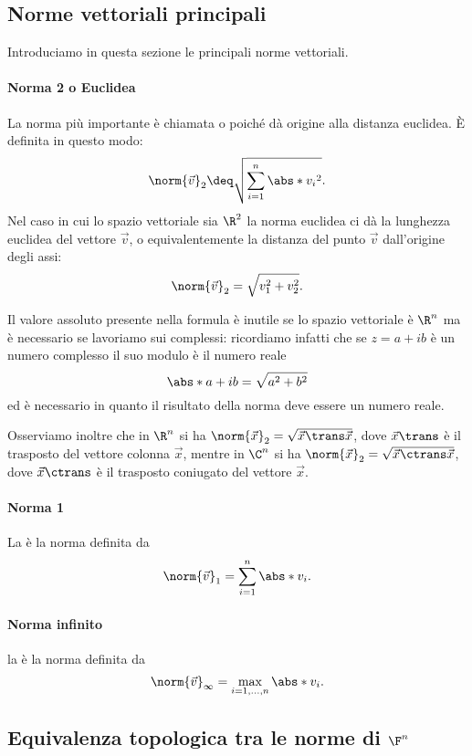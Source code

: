 \subsection{Norme vettoriali principali}

Introduciamo in questa sezione le principali norme vettoriali.

\paragraph{Norma 2 o Euclidea} La norma più importante è chiamata  o  poiché dà origine alla distanza euclidea. È definita in questo modo: \[
    \norm{\vec v}_2 \deq \sqrt{\sum_{i=1}^n \abs*{v_i}^2}.
\] Nel caso in cui lo spazio vettoriale sia $\R^2$ la norma euclidea ci dà la lunghezza euclidea del vettore $\vec v$, o equivalentemente la distanza del punto $\vec v$ dall'origine degli assi: \[
    \norm{\vec v}_2 = \sqrt{v_1^2 + v_2^2}.
\] 

Il valore assoluto presente nella formula è inutile se lo spazio vettoriale è $\R^n$ ma è necessario se lavoriamo sui complessi: ricordiamo infatti che se $z = a+ib$ è un numero complesso il suo modulo è il numero reale \[
    \abs*{a+ib} = \sqrt{a^2 + b^2}
\] ed è necessario in quanto il risultato della norma deve essere un numero reale.

Osserviamo inoltre che in $\R^n$ si ha 
$\norm{\vec x}_2 = \sqrt{\vec x\trans \vec x}$, 
dove $\vec x\trans$ è il trasposto del vettore colonna $\vec x$, 
mentre in $\C^n$ si ha $\norm{\vec x}_2 = \sqrt{\vec x\ctrans \vec x}$, 
dove $\vec x\ctrans$ è il trasposto coniugato del vettore $\vec x$.

\paragraph{Norma 1} La  è la norma definita da \[
    \norm{\vec v}_1 = \sum_{i=1}^n \abs*{v_i}.
\]

\paragraph{Norma infinito} la  è la norma definita da \[
    \norm{\vec v}_\infty = \max_{i=1, \dots, n} \abs*{v_i}.
\]

\subsection{Equivalenza topologica tra le norme di $\F^n$}

